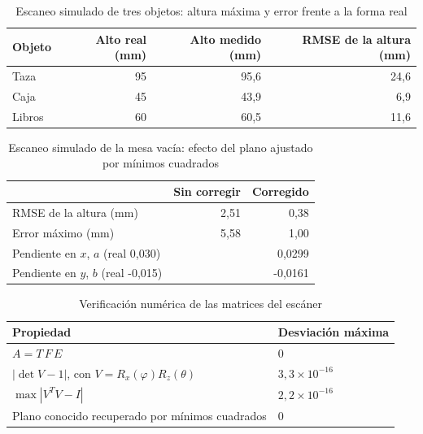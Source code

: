 \begin{table}[htbp]
\caption{Escaneo simulado de tres objetos: altura máxima y error frente a la forma real}
\label{tab:sim3d}
\begin{tabular}{lrrr}
\toprule
Objeto & Alto real (mm) & Alto medido (mm) & RMSE de la altura (mm) \\
\midrule
Taza & 95 & 95,6 & 24,6 \\
Caja & 45 & 43,9 & 6,9 \\
Libros & 60 & 60,5 & 11,6 \\
\bottomrule
\end{tabular}
\end{table}

\begin{table}[htbp]
\caption{Escaneo simulado de la mesa vacía: efecto del plano ajustado por mínimos cuadrados}
\label{tab:mesa}
\begin{tabular}{lrr}
\toprule
 & Sin corregir & Corregido \\
\midrule
RMSE de la altura (mm) & 2,51 & 0,38 \\
Error máximo (mm) & 5,58 & 1,00 \\
\midrule
Pendiente en $x$, $a$ (real 0,030) & \multicolumn{2}{r}{0,0299} \\
Pendiente en $y$, $b$ (real -0,015) & \multicolumn{2}{r}{-0,0161} \\
\bottomrule
\end{tabular}
\end{table}

\begin{table}[htbp]
\caption{Verificación numérica de las matrices del escáner}
\label{tab:verif3d}
\begin{tabular}{ll}
\toprule
Propiedad & Desviación máxima \\
\midrule
$A = T\,F\,E$ & $0$ \\
$|\det V - 1|$, con $V = R_x(\varphi)R_z(\theta)$ & $3{,}3 \times 10^{-16}$ \\
$\max |V^{T}V - I|$ & $2{,}2 \times 10^{-16}$ \\
Plano conocido recuperado por mínimos cuadrados & $0$ \\
\bottomrule
\end{tabular}
\end{table}
